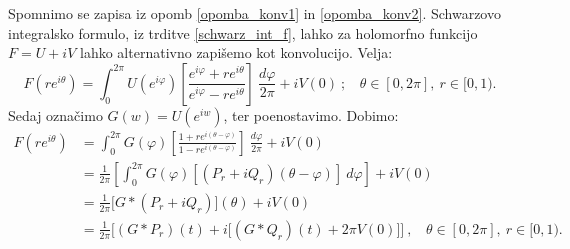 \documentclass[mat1]{fmfdelo}
\begin{document}
    \begin{opomba}
        Spomnimo se zapisa iz opomb \ref{opomba_konv1} in \ref{opomba_konv2}. Schwarzovo integralsko formulo, iz trditve \ref{schwarz_int_f}, lahko za holomorfno funkcijo $F = U + iV$ lahko alternativno zapišemo kot konvolucijo. Velja:
        $$
            F(r e^{i \theta}) = \int_{0}^{2 \pi}{U(e^{i \varphi})\left[\frac{e^{i \varphi}+r e^{i \theta}}{e^{i \varphi}-r e^{i \theta}}\right]~\frac{d \varphi}{2 \pi}} + i V(0)~;~~~~\theta \in [0,2 \pi],~r \in [0,1).
        $$
        Sedaj označimo $G(w) = U(e^{iw})$, ter poenostavimo. Dobimo:
        \begin{align*}
            F(r e^{i \theta}) & = \int_{0}^{2 \pi}{G(\varphi)\left[\frac{1 +r e^{i (\theta-\varphi)}}{1-r e^{i(\theta-\varphi)}}\right]}~\frac{d\varphi}{2 \pi} + iV(0)\\
            & = \frac{1}{2 \pi} \left[\int_{0}^{2 \pi}{G(\varphi)[(P_r + i Q_r)(\theta - \varphi)]}~d\varphi\right]+  iV(0) \\
            & = \frac{1}{2 \pi} \big[G * (P_r + iQ_r)\big](\theta) + iV(0)\\
            & = \frac{1}{2 \pi}\bigg[(G * P_r)(t) + i\big[(G * Q_r)(t) + 2 \pi V(0)\big]\bigg]~,~~~~\theta\in [0,2 \pi],~r \in [0,1).
        \end{align*}
    \end{opomba}
\end{document}
